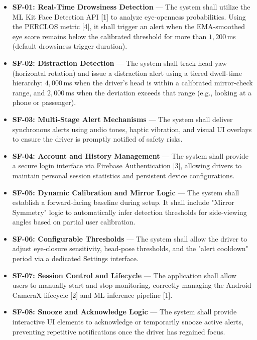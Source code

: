 \documentclass[11pt]{report}
\begin{document}
\begin{itemize}
    \item \textbf{SF-01: Real-Time Drowsiness Detection} —
    The system shall utilize the ML Kit Face Detection API [1] to analyze eye-openness probabilities. Using the PERCLOS metric [4], it shall trigger an alert when the EMA-smoothed eye score remains below the calibrated threshold for more than $1{,}200$\,ms (default drowsiness trigger duration).

    \item \textbf{SF-02: Distraction Detection} —
    The system shall track head yaw (horizontal rotation) and issue a distraction alert using a tiered dwell-time hierarchy: $4{,}000$\,ms when the driver's head is within a calibrated mirror-check range, and $2{,}000$\,ms when the deviation exceeds that range (e.g., looking at a phone or passenger).

    \item \textbf{SF-03: Multi-Stage Alert Mechanisms} —
    The system shall deliver synchronous alerts using audio tones, haptic vibration, and visual UI overlays to ensure the driver is promptly notified of safety risks.

    \item \textbf{SF-04: Account and History Management} —
    The system shall provide a secure login interface via Firebase Authentication [3], allowing drivers to maintain personal session statistics and persistent device configurations.

    \item \textbf{SF-05: Dynamic Calibration and Mirror Logic} —
    The system shall establish a forward-facing baseline during setup. It shall include "Mirror Symmetry" logic to automatically infer detection thresholds for side-viewing angles based on partial user calibration.

    \item \textbf{SF-06: Configurable Thresholds} —
    The system shall allow the driver to adjust eye-closure sensitivity, head-pose thresholds, and the "alert cooldown" period via a dedicated Settings interface.

    \item \textbf{SF-07: Session Control and Lifecycle} —
    The application shall allow users to manually start and stop monitoring, correctly managing the Android CameraX lifecycle [2] and ML inference pipeline [1].

    \item \textbf{SF-08: Snooze and Acknowledge Logic} —
    The system shall provide interactive UI elements to acknowledge or temporarily snooze active alerts, preventing repetitive notifications once the driver has regained focus.


\end{itemize}
\end{document}
